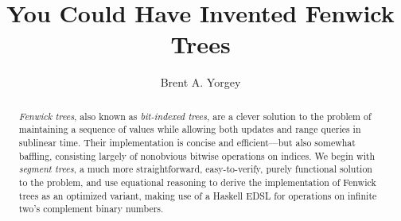 \documentclass{jfp}
\theoremstyle{definition}
\theoremstyle{remark}
\begin{document}


\title{You Could Have Invented Fenwick Trees}
\begin{authgrp}
  \author{Brent A. Yorgey}
\end{authgrp}

\begin{abstract}
  \emph{Fenwick trees}, also known as \emph{bit-indexed trees}, are a
  clever solution to the problem of maintaining a sequence of values
  while allowing both updates and range queries in sublinear time.
  Their implementation is concise and efficient---but also somewhat
  baffling, consisting largely of nonobvious bitwise operations on
  indices.  We begin with \emph{segment trees}, a much more
  straightforward, easy-to-verify, purely functional solution to the
  problem, and use equational reasoning to derive the implementation
  of Fenwick trees as an optimized variant, making use of a Haskell
  EDSL for operations on infinite two's complement binary numbers.
\end{abstract}






\maketitle[F]
\end{document}
